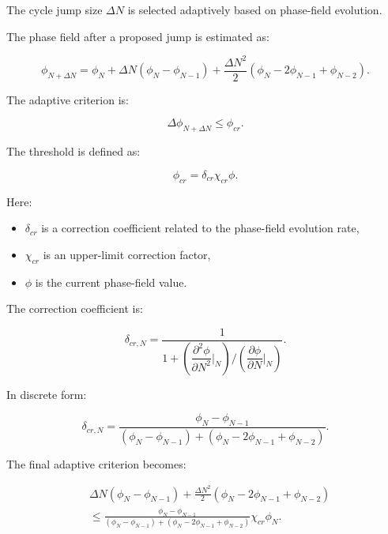\documentclass[11pt,a4paper]{article}
\begin{document}
The cycle jump size $\Delta N$ is selected adaptively based on phase-field evolution.

The phase field after a proposed jump is estimated as:

\begin{equation}
\phi_{N+\Delta N}
=
\phi_N
+
\Delta N(\phi_N-\phi_{N-1})
+
\frac{\Delta N^2}{2}
(\phi_N-2\phi_{N-1}+\phi_{N-2}) .
\end{equation}

The adaptive criterion is:

\begin{equation}
\Delta \phi_{N+\Delta N}
\leq
\phi_{cr}.
\end{equation}

The threshold is defined as:

\begin{equation}
\phi_{cr}
=
\delta_{cr}\chi_{cr}\phi .
\end{equation}

Here:

\begin{itemize}
    \item $\delta_{cr}$ is a correction coefficient related to the phase-field evolution rate,
    \item $\chi_{cr}$ is an upper-limit correction factor,
    \item $\phi$ is the current phase-field value.
\end{itemize}

The correction coefficient is:

\begin{equation}
\delta_{cr,N}
=
\frac{1}
{
1+
\left(
\dfrac{\partial^2 \phi}{\partial N^2}\big|_N
\right)
/
\left(
\dfrac{\partial \phi}{\partial N}\big|_N
\right)
}.
\end{equation}

In discrete form:

\begin{equation}
\delta_{cr,N}
=
\frac{
\phi_N-\phi_{N-1}
}
{
(\phi_N-\phi_{N-1})
+
(\phi_N-2\phi_{N-1}+\phi_{N-2})
}.
\end{equation}

The final adaptive criterion becomes:

\begin{equation}
\begin{aligned}
&
\Delta N(\phi_N-\phi_{N-1})
+
\frac{\Delta N^2}{2}
(\phi_N-2\phi_{N-1}+\phi_{N-2})
\\
&\leq
\frac{
\phi_N-\phi_{N-1}
}
{
(\phi_N-\phi_{N-1})
+
(\phi_N-2\phi_{N-1}+\phi_{N-2})
}
\chi_{cr}\phi_N .
\end{aligned}
\end{equation}
\end{document}
